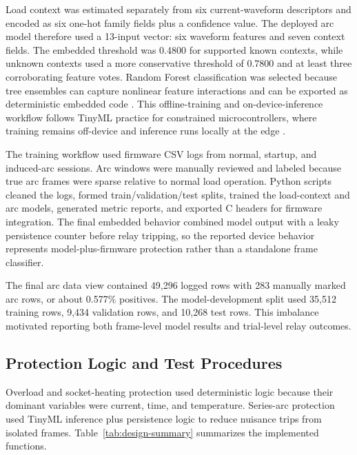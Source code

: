 \documentclass[twocolumn,twoside]{base/ajstd}
\begin{document}
Load context was estimated separately from six current-waveform descriptors and encoded as six one-hot family fields plus a confidence value. The deployed arc model therefore used a 13-input vector: six waveform features and seven context fields. The embedded threshold was 0.4800 for supported known contexts, while unknown contexts used a more conservative threshold of 0.7800 and at least three corroborating feature votes. Random Forest classification was selected because tree ensembles can capture nonlinear feature interactions and can be exported as deterministic embedded code \citep{Breiman2001RandomForests}. This offline-training and on-device-inference workflow follows TinyML practice for constrained microcontrollers, where training remains off-device and inference runs locally at the edge \citep{Ray2021TinyMLIoT,Immonen2022TinyMLMicrocontrollers,Antonini2023TinyML}.

The training workflow used firmware CSV logs from normal, startup, and induced-arc sessions. Arc windows were manually reviewed and labeled because true arc frames were sparse relative to normal load operation. Python scripts cleaned the logs, formed train/validation/test splits, trained the load-context and arc models, generated metric reports, and exported C headers for firmware integration. The final embedded behavior combined model output with a leaky persistence counter before relay tripping, so the reported device behavior represents model-plus-firmware protection rather than a standalone frame classifier.

The final arc data view contained 49,296 logged rows with 283 manually marked arc rows, or about 0.577\% positives. The model-development split used 35,512 training rows, 9,434 validation rows, and 10,268 test rows. This imbalance motivated reporting both frame-level model results and trial-level relay outcomes.

\subsection{Protection Logic and Test Procedures}

Overload and socket-heating protection used deterministic logic because their dominant variables were current, time, and temperature. Series-arc protection used TinyML inference plus persistence logic to reduce nuisance trips from isolated frames. Table~\ref{tab:design-summary} summarizes the implemented functions.
\end{document}
